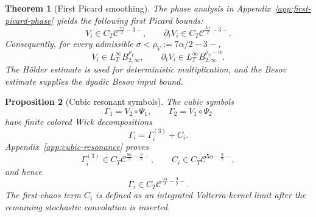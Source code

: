 \documentclass[10pt]{amsart}
\numberwithin{equation}{section}
\theoremstyle{plain}
\newtheorem{theorem}{Theorem}[section]
\newtheorem{proposition}[theorem]{Proposition}
\theoremstyle{definition}
\theoremstyle{remark}
\newcommand{\C}{\mathcal{C}}
\begin{document}
\begin{theorem}[First Picard smoothing]\label{thm:first-picard-main}
The phase analysis in Appendix~\ref{app:first-picard-phase} yields the following first Picard bounds:
\begin{equation}\label{eq:first-picard-gain-intro}
        V_i\in C_T\C^{\frac{7\alpha}{2}-3-},
        \qquad
        \partial_tV_i\in C_T\C^{\frac{5\alpha}{2}-3-}.
\end{equation}
Consequently, for every admissible $\sigma<\rho_V:=7\alpha/2-3-$,
\begin{equation}\label{eq:first-picard-besov-intro}
        V_i\in L_T^\infty B_{2,\infty}^{\rho_V},
        \qquad
        \partial_tV_i\in L_T^\infty B_{2,\infty}^{\rho_V-\alpha}.
\end{equation}
The H\"older estimate is used for deterministic multiplication, and the Besov estimate supplies the dyadic Besov input bound.
\end{theorem}

\begin{proposition}[Cubic resonant symbols]\label{prop:cubic-resonance}
The cubic symbols
\[
        \Gamma_1=V_2\circ\Psi_1,
        \qquad
        \Gamma_2=V_1\circ\Psi_2
\]
have finite colored Wick decompositions
\begin{equation}\label{eq:cubic-main-decomp-intro}
        \Gamma_i=\Gamma_i^{(3)}+C_i.
\end{equation}
Appendix~\ref{app:cubic-resonance} proves
\begin{equation}\label{eq:cubic-components}
        \Gamma_i^{(3)}\in C_T\C^{\frac{9\alpha}{2}-\frac92-},
        \qquad
        C_i\in C_T\C^{5\alpha-\frac92-},
\end{equation}
and hence
\begin{equation}\label{eq:cubic-total-regularity}
        \Gamma_i\in C_T\C^{\frac{9\alpha}{2}-\frac92-}.
\end{equation}
The first-chaos term $C_i$ is defined as an integrated Volterra-kernel limit after the remaining stochastic convolution is inserted.
\end{proposition}
\end{document}
